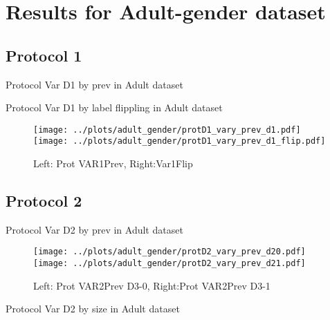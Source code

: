 \documentclass[10pt,a4paper]{article}
\begin{document}
\section{Results for Adult-gender dataset}

\subsection{Protocol 1}

\begin{table}[h!]

\caption{Protocol Var D1 by prev in Adult dataset}
\end{table}

\begin{table}[h!]

\caption{Protocol Var D1 by label flippling in Adult dataset}
\end{table}

\begin{figure}[h!]
\texttt{[image: ../plots/adult\_gender/protD1\_vary\_prev\_d1.pdf]}
\texttt{[image: ../plots/adult\_gender/protD1\_vary\_prev\_d1\_flip.pdf]}
\caption{Left: Prot VAR1Prev, Right:Var1Flip}
\end{figure}

\clearpage
\newpage
\subsection{Protocol 2}

\begin{table}[h!]

\caption{Protocol Var D2 by prev in Adult dataset}
\end{table}

\begin{figure}[h!]
\texttt{[image: ../plots/adult\_gender/protD2\_vary\_prev\_d20.pdf]}
\texttt{[image: ../plots/adult\_gender/protD2\_vary\_prev\_d21.pdf]}
\caption{Left: Prot VAR2Prev D3-0, Right:Prot VAR2Prev D3-1}
\end{figure}

\begin{table}[h!]

\caption{Protocol Var D2 by size in Adult dataset}
\end{table}
\end{document}
